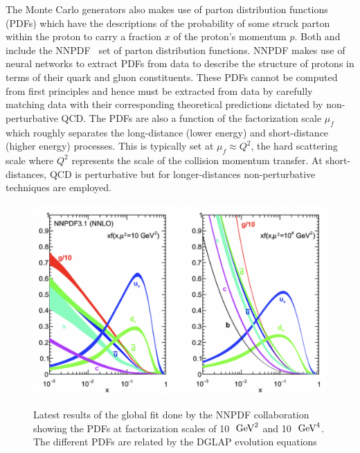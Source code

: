 The Monte Carlo generators also makes use of parton distribution functions (PDFs) which have the descriptions of the probability of some struck parton within the proton to carry a fraction $x$ of the proton's momentum $p$. Both \SHERPA and  include the NNPDF~\cite{NNPDF:2021uiq} set of parton distribution functions. NNPDF makes use of neural networks to extract PDFs from data to describe the structure of protons in terms of their quark and gluon constituents. These PDFs cannot be computed from first principles and hence must be extracted from data by carefully matching data with their corresponding theoretical predictions dictated by non-perturbative QCD. The PDFs are also a function of the factorization scale $\mu_{f}$ which roughly separates the long-distance (lower energy) and short-distance (higher energy) processes. This is typically set at $\mu_{f}\approx Q^{2}$, the hard scattering scale where $Q^2$ represents the scale of the collision momentum transfer. At short-distances, QCD is perturbative but for longer-distances non-perturbative techniques are employed. 


\begin{figure}[!htbp]
    \caption{Latest results of the global fit done by the NNPDF collaboration showing the PDFs at factorization scales of 10~$\,\text{Ge\hspace{-.08em}V}^{2}$ and 10~$\,\text{Ge\hspace{-.08em}V}^{4}$. The different PDFs are related by the DGLAP evolution equations~\cite{DelDebbio:2018siw}}
	\centering
	\includegraphics[scale=0.5]{fig/NNPDFGlobalFit.png}
	\label{fig:NNPDF}
\end{figure}

